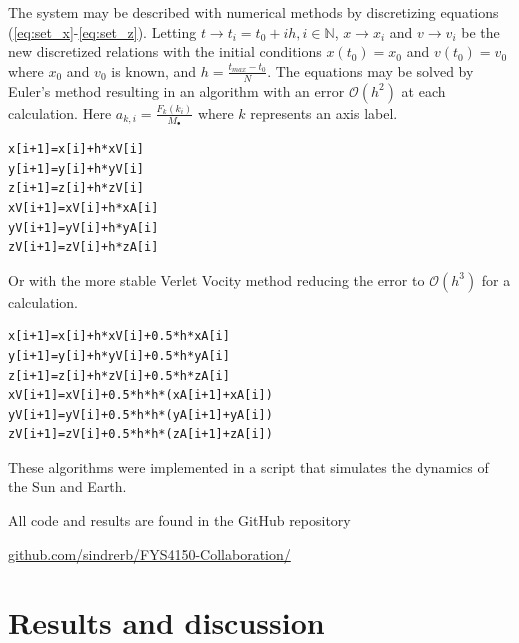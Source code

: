 \documentclass[twoside,twocolumn]{article}
\newcommand{\nl}{
	
	\medskip
	\noindent
}
\newcommand{\planet}{\bullet}
\newcommand{\err}[1]{\mathcal{O}(#1)}
\begin{document}
The system may be described with numerical methods by discretizing equations (\ref{eq:set_x}-\ref{eq:set_z}). Letting  $t\rightarrow t_i=t_0+ih, i\in \mathbb{N}$, $x\rightarrow x_i$ and $v\rightarrow v_i$ be the new discretized relations with the initial conditions $x(t_0)=x_0$ and $v(t_0)=v_0$ where $x_0$ and $v_0$ is known, and $h=\frac{t_{max}-t_0}{N} $. The equations may be solved by Euler's method resulting in an algorithm with an error $\err{h^2}$ at each calculation. Here $a_{k,i}=\frac{F_k(k_i)}{M_\planet}$ where $k$ represents an axis label.
\begin{lstlisting}[style=customc]
x[i+1]=x[i]+h*xV[i]
y[i+1]=y[i]+h*yV[i]
z[i+1]=z[i]+h*zV[i]
xV[i+1]=xV[i]+h*xA[i]
yV[i+1]=yV[i]+h*yA[i]
zV[i+1]=zV[i]+h*zA[i]
\end{lstlisting}

Or with the more stable Verlet Vocity method reducing the error to $\err{h^3}$ for a calculation. 
\begin{lstlisting}[style=customc]
x[i+1]=x[i]+h*xV[i]+0.5*h*xA[i]
y[i+1]=y[i]+h*yV[i]+0.5*h*yA[i]
z[i+1]=z[i]+h*zV[i]+0.5*h*zA[i]
xV[i+1]=xV[i]+0.5*h*h*(xA[i+1]+xA[i])
yV[i+1]=yV[i]+0.5*h*h*(yA[i+1]+yA[i])
zV[i+1]=zV[i]+0.5*h*h*(zA[i+1]+zA[i])
\end{lstlisting}
These algorithms were implemented in a script that simulates the dynamics of the Sun and Earth. 

All code and results are found in the GitHub repository\nl
{\small \href{https://github.com/sindrerb/FYS4150-Collaboration/tree/master/Doc/Project3}{github.com/sindrerb/FYS4150-Collaboration/}}
\section{Results and discussion}
\label{sec:results}
\end{document}
